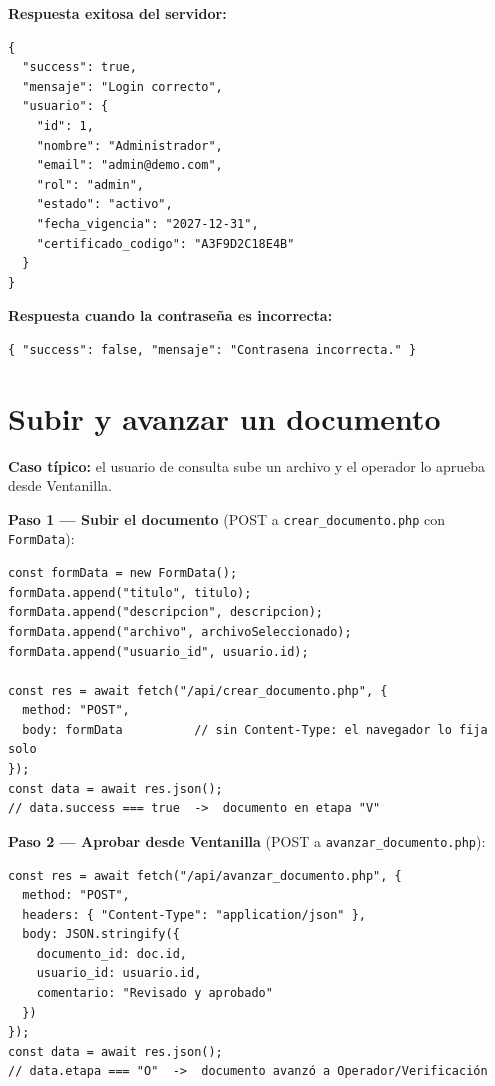 \documentclass[10pt,letterpaper]{report}
\begin{document}
\textbf{Respuesta exitosa del servidor:}

\begin{lstlisting}[style=bashstyle, caption={Respuesta JSON de login.php para credenciales válidas (elaboración propia).}]
{
  "success": true,
  "mensaje": "Login correcto",
  "usuario": {
    "id": 1,
    "nombre": "Administrador",
    "email": "admin@demo.com",
    "rol": "admin",
    "estado": "activo",
    "fecha_vigencia": "2027-12-31",
    "certificado_codigo": "A3F9D2C18E4B"
  }
}
\end{lstlisting}

\textbf{Respuesta cuando la contraseña es incorrecta:}

\begin{lstlisting}[style=bashstyle, caption={Respuesta JSON de login.php para credenciales inválidas (elaboración propia).}]
{ "success": false, "mensaje": "Contrasena incorrecta." }
\end{lstlisting}

\section{Subir y avanzar un documento}

\textbf{Caso típico:} el usuario de consulta sube un archivo y el operador lo aprueba desde Ventanilla.

\textbf{Paso 1 — Subir el documento} (POST a \texttt{crear\_documento.php} con \texttt{FormData}):

\begin{lstlisting}[style=jsstyle, caption={Subida de documento con FormData desde GestorDocumentos.jsx (elaboración propia).}]
const formData = new FormData();
formData.append("titulo", titulo);
formData.append("descripcion", descripcion);
formData.append("archivo", archivoSeleccionado);
formData.append("usuario_id", usuario.id);

const res = await fetch("/api/crear_documento.php", {
  method: "POST",
  body: formData          // sin Content-Type: el navegador lo fija solo
});
const data = await res.json();
// data.success === true  ->  documento en etapa "V"
\end{lstlisting}

\textbf{Paso 2 — Aprobar desde Ventanilla} (POST a \texttt{avanzar\_documento.php}):

\begin{lstlisting}[style=jsstyle, caption={Aprobación de documento V→O desde GestorDocumentos.jsx (elaboración propia).}]
const res = await fetch("/api/avanzar_documento.php", {
  method: "POST",
  headers: { "Content-Type": "application/json" },
  body: JSON.stringify({
    documento_id: doc.id,
    usuario_id: usuario.id,
    comentario: "Revisado y aprobado"
  })
});
const data = await res.json();
// data.etapa === "O"  ->  documento avanzó a Operador/Verificación
\end{lstlisting}
\end{document}
